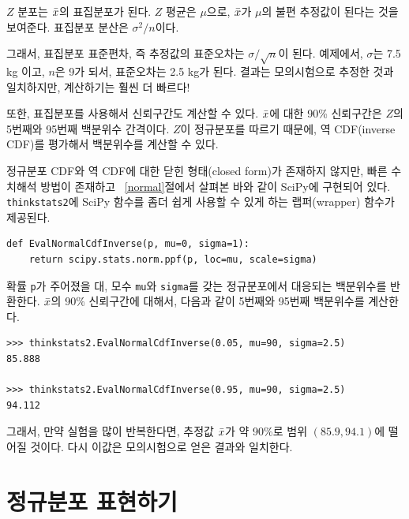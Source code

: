 $Z$ 분포는 $\bar{x}$의 표집분포가 된다.
$Z$ 평균은 $\mu$으로, $\bar{x}$가 $\mu$의 불편 추정값이 된다는 것을 보여준다.
표집분포 분산은 $\sigma^2 / n$이다.

그래서, 표집분포 표준편차, 즉 추정값의 표준오차는 $\sigma / \sqrt{n}$이 된다. 예제에서, $\sigma$는 7.5 kg 이고, $n$은 9가 되서, 표준오차는 2.5 kg가 된다.
결과는 모의시험으로 추정한 것과 일치하지만, 계산하기는 훨씬 더 빠르다!

또한, 표집분포를 사용해서 신뢰구간도 계산할 수 있다.
$\bar{x}$에 대한 90\% 신뢰구간은 $Z$의 5번째와 95번째 백분위수 간격이다.
$Z$이 정규분포를 따르기 때문에, 역 CDF(inverse CDF)를 평가해서 백분위수를 계산할 수 있다.

정규분포 CDF와 역 CDF에 대한 닫힌 형태(closed form)가 존재하지 않지만, 
빠른 수치해석 방법이 존재하고 ~\ref{normal}절에서 살펴본 바와 같이 SciPy에 
구현되어 있다. {\tt thinkstats2}에 SciPy 함수를 좀더 쉽게 사용할 수 있게 하는 랩퍼(wrapper) 함수가 제공된다.

\begin{verbatim}
def EvalNormalCdfInverse(p, mu=0, sigma=1):
    return scipy.stats.norm.ppf(p, loc=mu, scale=sigma)
\end{verbatim}

확률 {\tt p}가 주어졌을 대, 모수 {\tt mu}와 {\tt sigma}를 갖는 정규분포에서 대응되는 백분위수를 반환한다. 
$\bar{x}$의 90\% 신뢰구간에 대해서, 
다음과 같이 5번째와 95번째 백분위수를 계산한다.

\begin{verbatim}
>>> thinkstats2.EvalNormalCdfInverse(0.05, mu=90, sigma=2.5)
85.888

>>> thinkstats2.EvalNormalCdfInverse(0.95, mu=90, sigma=2.5)
94.112
\end{verbatim}

그래서, 만약 실험을 많이 반복한다면, 추정값 $\bar{x}$가 약 90\%로 범위 $(85.9, 94.1)$에 떨어질 것이다. 
다시 이값은 모의시험으로 얻은 결과와 일치한다.


\section{정규분포 표현하기}

